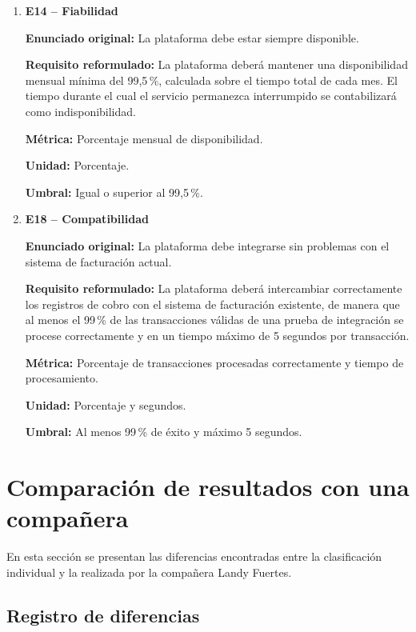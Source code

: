 \documentclass[12pt,a4paper,oneside]{article}
\begin{document}
\begin{enumerate}[leftmargin=1.2cm]
    \textbf{Umbral:} Al menos 90\,\% de éxito y máximo 3 minutos.

    \item \textbf{E14 -- Fiabilidad}

    \textbf{Enunciado original:} La plataforma debe estar
    siempre disponible.

    \textbf{Requisito reformulado:} La plataforma deberá mantener una disponibilidad mensual mínima del 99,5\,\%, calculada sobre el tiempo total de cada mes. El tiempo durante el cual el servicio permanezca interrumpido se contabilizará como indisponibilidad.

    \textbf{Métrica:} Porcentaje mensual de disponibilidad.

    \textbf{Unidad:} Porcentaje.

    \textbf{Umbral:} Igual o superior al 99,5\,\%.

    \item \textbf{E18 -- Compatibilidad}

    \textbf{Enunciado original:} La plataforma debe integrarse
    sin problemas con el sistema de facturación actual.

    \textbf{Requisito reformulado:} La plataforma deberá
    intercambiar correctamente los registros de cobro con
    el sistema de facturación existente, de manera que al
    menos el 99\,\% de las transacciones válidas de una prueba
    de integración se procese correctamente y en un tiempo
    máximo de 5 segundos por transacción.

    \textbf{Métrica:} Porcentaje de transacciones procesadas
    correctamente y tiempo de procesamiento.

    \textbf{Unidad:} Porcentaje y segundos.

    \textbf{Umbral:} Al menos 99\,\% de éxito y máximo 5 segundos.

\end{enumerate}


\section{Comparación de resultados con una compañera}

En esta sección se presentan las diferencias encontradas entre la clasificación individual y la realizada por la compañera Landy Fuertes.

\subsection{Registro de diferencias}
\end{document}
